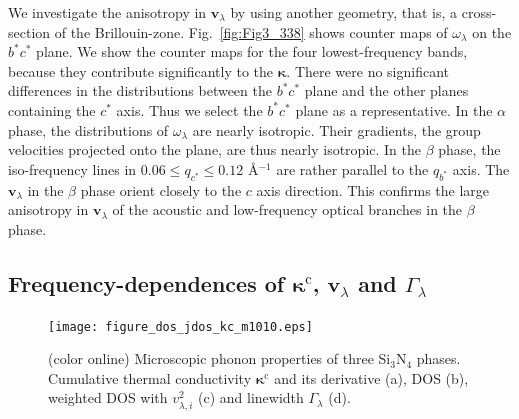 \documentclass[twocolumn,amsmath,amssymb,a4paper,prb,superscriptaddress,floatfix]{revtex4-1}
\begin{document}
We investigate the anisotropy in $\mathbf{v}_{\lambda}$ by using another geometry, that
is, a cross-section of the Brillouin-zone. Fig.~\ref{fig:Fig3_338} shows
counter maps of $\omega_{\lambda}$  on the $b^*c^*$ plane.  We show the
counter maps for the four lowest-frequency bands, because they
contribute significantly to the $\boldsymbol{\kappa}$.  There were no 
significant differences in the distributions between the $b^*c^*$ plane and the
other planes containing the $c^*$ axis.  Thus we select the $b^*c^*$ plane as a
representative.  In the $\alpha$ phase, the distributions of $\omega_{\lambda}$ are nearly
isotropic. Their gradients, the group velocities projected onto the plane, are
thus nearly isotropic. In the $\beta$ phase, the iso-frequency lines in $0.06
\le q_{c^*} \le 0.12$ \AA$^{-1}$ are rather parallel to the $q_{b^*}$ axis.
The $\mathbf{v}_{\lambda}$ in the $\beta$ phase orient closely to the
$c$ axis direction. This confirms the large anisotropy in $\mathbf{v}_{\lambda}$
of the acoustic and low-frequency optical branches in the $\beta$ phase.

\subsection{Frequency-dependences of $\boldsymbol{\kappa}^\text{c}$, $\mathbf{v}$$_\lambda$ and $\Gamma_\lambda$}

\begin{figure}[ht]
 \begin{center}
  \texttt{[image: figure\_dos\_jdos\_kc\_m1010.eps]}
  \caption{(color online) Microscopic phonon properties of three Si$_3$N$_4$
	  phases. Cumulative thermal conductivity $\mathbf{\kappa}^\text{c}$ and its derivative
	  (a), DOS (b), weighted DOS with $v_{\lambda,i}^2$ (c) and linewidth $\Gamma_\lambda$ (d).
  \label{fig:Fig5_338_rev} }
 \end{center}
\end{figure}
\end{document}
